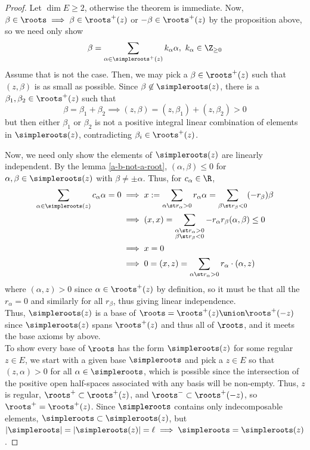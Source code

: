 \documentclass[11pt,leqno,oneside]{amsart}
\numberwithin{thm}{section}
\begin{document}
\begin{proof}
  Let \(\dim E \geq 2\), otherwise the theorem is immediate. Now,\(\beta
  \in \roots \implies \beta \in \roots^+(z)\) or \(-\beta \in 
  \roots^+(z)\) by the proposition above, so we need only show \[
    \beta = \sum_{\alpha \in \simpleroots^+(z)} k_\alpha \alpha, \
    k_\alpha \in \Z_{\geq 0}
  \]
  Assume that is not the case. Then, we may pick a \(\beta \in
  \roots^+(z)\) such that \((z,\beta)\) is as small as possible. Since
  \(\beta \not \in \simpleroots(z)\), there is a \(\beta_1, \beta_2
  \in \roots^+(z)\) such that \[
    \beta = \beta_1 + \beta_2 \implies (z,\beta) = (z,\beta_1) +
    (z,\beta_2) > 0
  \]
  but then either \(\beta_1\) or \(\beta_2\) is not a positive
  integral linear combination of elements in \(\simpleroots(z)\),
  contradicting \(\beta_i \in \roots^+(z)\).

  Now, we need only show the elements of \(\simpleroots(z)\) are
  linearly independent. By the lemma \ref{a-b-not-a-root}, \((\alpha,\beta) \leq 0\)
  for \(\alpha,\beta \in \simpleroots(z)\) with \(\beta \neq \pm
  \alpha\). Thus, for \(c_\alpha \in \R\), 
  \begin{align*}
    \sum_{\alpha \in \simpleroots(z)} c_\alpha \alpha = 0
    & \implies x := \sum_{\alpha \st r_\alpha > 0} r_\alpha \alpha =
      \sum_{\beta \st r_\beta < 0 } (-r_\beta) \beta \\
    & \implies (x,x) = \sum_{\substack{\alpha \st r_\alpha > 0 \\
    \beta \st r_\beta < 0}} -r_\alpha r_\beta (\alpha,\beta) \leq 0 \\
    & \implies x = 0 \\
    & \implies 0 = (x,z) = \sum_{\alpha \st r_\alpha > 0} r_\alpha
      \cdot (\alpha, z)
  \end{align*}
  where \((\alpha,z) > 0\) since \(\alpha \in \roots^+(z)\) by
  definition, so it must be that all the \(r_\alpha = 0\) and
  similarly for all \(r_\beta\), thus giving linear independence. \\

  Thus, \(\simpleroots(z)\) is a base of \(\roots = \roots^+(z) \union
  \roots^+(-z)\) since \(\simpleroots(z)\) spans \(\roots^+(z)\) and
  thus all of \(\roots\), and it meets the base axioms by above. \\

  To show every base of \(\roots\) has the form \(\simpleroots(z)\)
  for some regular \(z \in E\), we start with a given base
  \(\simpleroots\) and pick a \(z \in E\) so that \((z,\alpha) > 0\)
  for all \(\alpha \in \simpleroots\), which is possible since the
  intersection of the positive open half-spaces associated with any basis
  will be non-empty. Thus, \(z\) is regular, \(\roots^+ \subset
  \roots^+(z)\), and \(\roots^- \subset \roots^+(-z)\), so \(\roots^+
  = \roots^+(z)\). Since \(\simpleroots\) contains only indecomposable
  elements, \(\simpleroots \subset \simpleroots(z)\), but
  \(|\simpleroots| = |\simpleroots(z)| = \ell \implies \simpleroots =
  \simpleroots(z)\). 
\end{proof}
\end{document}
